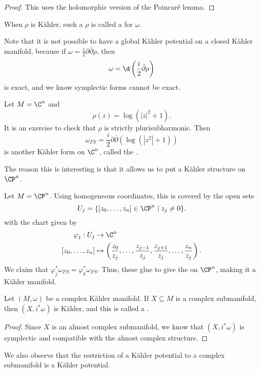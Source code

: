 \documentclass[a4paper]{article}
\begin{document}
\begin{proof}
  This uses the holomorphic version of the Poincar\'e lemma.
\end{proof}

When $\rho$ is K\"ahler, such a $\rho$ is called a  for $\omega$.

Note that it is not possible to have a global K\"ahler potential on a closed K\"ahler manifold, because if $\omega = \frac{i}{2}\partial \bar{\partial} \rho$, then
\[
  \omega = \d \left(\frac{i}{2} \bar{\partial} \rho\right)
\]
is exact, and we know symplectic forms cannot be exact.

\begin{eg}
  Let $M = \C^n$ and
  \[
    \rho(z) = \log (|z|^2 + 1).
  \]
  It is an exercise to check that $\rho$ is strictly plurisubharmonic. Then
  \[
    \omega_{FS} = \frac{i}{2} \partial \bar{\partial} (\log(|z^2| + 1))
  \]
  is another K\"ahler form on $\C^n$, called the .
\end{eg}
The reason this is interesting is that it allows us to put a K\"ahler structure on $\CP^n$.
\begin{eg}
  Let $M = \CP^n$. Using homogeneous coordinates, this is covered by the open sets
  \[
    U_j = \{[z_0, \ldots, z_n] \in \CP^n \mid z_j \not= 0\}.
  \]
  with the chart given by
  \begin{align*}
    \varphi_j: U_j &\to \C^n\\
    [z_0, \ldots, z_n] &\mapsto \left(\frac{z_0}{z_j}, \ldots, \frac{z_{j - 1}}{z_j}, \frac{z_{j + 1}}{z_j}, \ldots, \frac{z_n}{z_j}\right).
  \end{align*}
  We claim that $\varphi_j^* \omega_{FS} = \varphi_k^* \omega_{FS}$. Thus, these glue to give the  on $\CP^n$, making it a K\"ahler manifold.
\end{eg}

\begin{prop}
  Let $(M, \omega)$ be a complex K\"ahler manifold. If $X \subseteq M$ is a complex submanifold, then $(X, i^* \omega)$ is K\"ahler, and this is called a .
\end{prop}

\begin{proof}
  Since $X$ is an almost complex submanifold, we know that $(X, i^* \omega)$ is symplectic and compatible with the almost complex structure.
\end{proof}
We also observe that the restriction of a K\"ahler potential to a complex submanifold is a K\"ahler potential.
\end{document}
